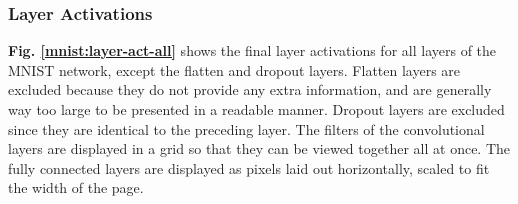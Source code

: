 \subsubsection{Layer Activations}

\textbf{Fig. \ref{mnist:layer-act-all}} shows the final layer activations for all layers of the MNIST network, except the flatten and dropout layers. Flatten layers are excluded because they do not provide any extra information, and are generally way too large to be presented in a readable manner. Dropout layers are excluded since they are identical to the preceding layer. The filters of the convolutional layers are displayed in a grid so that they can be viewed together all at once. The fully connected layers are displayed as pixels laid out horizontally, scaled to fit the width of the page. \\

